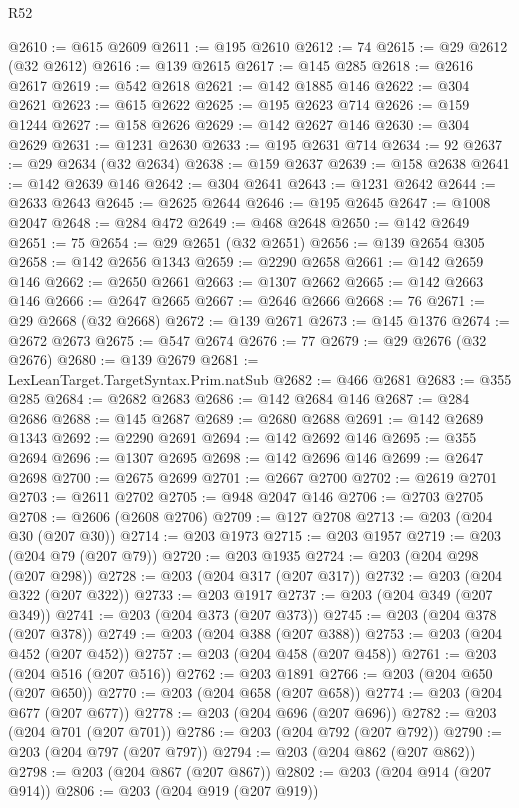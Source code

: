 \begin{lexlean}{R52}
\begin{coremodule}
@2610 := @615 @2609
@2611 := @195 @2610
@2612 := 74
@2615 := @29 @2612 (@32 @2612)
@2616 := @139 @2615
@2617 := @145 @285
@2618 := @2616 @2617
@2619 := @542 @2618
@2621 := @142 @1885 @146
@2622 := @304 @2621
@2623 := @615 @2622
@2625 := @195 @2623 @714
@2626 := @159 @1244
@2627 := @158 @2626
@2629 := @142 @2627 @146
@2630 := @304 @2629
@2631 := @1231 @2630
@2633 := @195 @2631 @714
@2634 := 92
@2637 := @29 @2634 (@32 @2634)
@2638 := @159 @2637
@2639 := @158 @2638
@2641 := @142 @2639 @146
@2642 := @304 @2641
@2643 := @1231 @2642
@2644 := @2633 @2643
@2645 := @2625 @2644
@2646 := @195 @2645
@2647 := @1008 @2047
@2648 := @284 @472
@2649 := @468 @2648
@2650 := @142 @2649
@2651 := 75
@2654 := @29 @2651 (@32 @2651)
@2656 := @139 @2654 @305
@2658 := @142 @2656 @1343
@2659 := @2290 @2658
@2661 := @142 @2659 @146
@2662 := @2650 @2661
@2663 := @1307 @2662
@2665 := @142 @2663 @146
@2666 := @2647 @2665
@2667 := @2646 @2666
@2668 := 76
@2671 := @29 @2668 (@32 @2668)
@2672 := @139 @2671
@2673 := @145 @1376
@2674 := @2672 @2673
@2675 := @547 @2674
@2676 := 77
@2679 := @29 @2676 (@32 @2676)
@2680 := @139 @2679
@2681 := LexLeanTarget.TargetSyntax.Prim.natSub
@2682 := @466 @2681
@2683 := @355 @285
@2684 := @2682 @2683
@2686 := @142 @2684 @146
@2687 := @284 @2686
@2688 := @145 @2687
@2689 := @2680 @2688
@2691 := @142 @2689 @1343
@2692 := @2290 @2691
@2694 := @142 @2692 @146
@2695 := @355 @2694
@2696 := @1307 @2695
@2698 := @142 @2696 @146
@2699 := @2647 @2698
@2700 := @2675 @2699
@2701 := @2667 @2700
@2702 := @2619 @2701
@2703 := @2611 @2702
@2705 := @948 @2047 @146
@2706 := @2703 @2705
@2708 := @2606 (@2608 @2706)
@2709 := @127 @2708
@2713 := @203 (@204 @30 (@207 @30))
@2714 := @203 @1973
@2715 := @203 @1957
@2719 := @203 (@204 @79 (@207 @79))
@2720 := @203 @1935
@2724 := @203 (@204 @298 (@207 @298))
@2728 := @203 (@204 @317 (@207 @317))
@2732 := @203 (@204 @322 (@207 @322))
@2733 := @203 @1917
@2737 := @203 (@204 @349 (@207 @349))
@2741 := @203 (@204 @373 (@207 @373))
@2745 := @203 (@204 @378 (@207 @378))
@2749 := @203 (@204 @388 (@207 @388))
@2753 := @203 (@204 @452 (@207 @452))
@2757 := @203 (@204 @458 (@207 @458))
@2761 := @203 (@204 @516 (@207 @516))
@2762 := @203 @1891
@2766 := @203 (@204 @650 (@207 @650))
@2770 := @203 (@204 @658 (@207 @658))
@2774 := @203 (@204 @677 (@207 @677))
@2778 := @203 (@204 @696 (@207 @696))
@2782 := @203 (@204 @701 (@207 @701))
@2786 := @203 (@204 @792 (@207 @792))
@2790 := @203 (@204 @797 (@207 @797))
@2794 := @203 (@204 @862 (@207 @862))
@2798 := @203 (@204 @867 (@207 @867))
@2802 := @203 (@204 @914 (@207 @914))
@2806 := @203 (@204 @919 (@207 @919))

\end{coremodule}
\end{lexlean}
